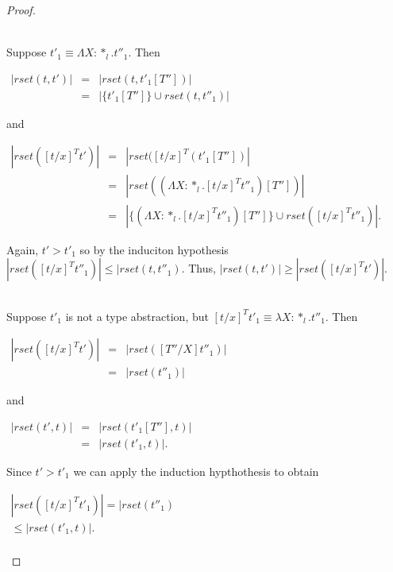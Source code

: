 \begin{proof}
\begin{itemize}
  \ \\
  Suppose $t'_1 \equiv \Lambda X:*_l.t''_1$.  Then 
  \begin{center}
    \begin{math}
      \begin{array}{lll}
        |rset(t,t')| & = & |rset(t, t'_1[T''])|\\
        & = & |\{t'_1[T'']\} \cup rset(t,t''_1)|
      \end{array}
    \end{math}
  \end{center}
  and
  \begin{center}
    \begin{math}
      \begin{array}{lll}
        |rset([t/x]^T t')| & = & |rset([t/x]^T(t'_1[T''])|\\
        & = & |rset((\Lambda X:*_l.[t/x]^T t''_1)[T''])|\\
        & = & |\{(\Lambda X:*_l.[t/x]^T t''_1)[T'']\} \cup rset([t/x]^T t''_1)|.
      \end{array}
    \end{math}
  \end{center}
  Again, $t' > t'_1$ so by the induciton hypothesis $|rset([t/x]^T t''_1)| \leq |rset(t,t''_1)$.  Thus,
  $|rset(t,t')| \geq |rset([t/x]^T t')|$.
  
  \ \\
  Suppose $t'_1$ is not a type abstraction, but $[t/x]^T t'_1 \equiv \lambda X:*_l.t''_1$.  Then
  \begin{center}
    \begin{math}
      \begin{array}{lll}
        |rset([t/x]^T t')| & = & |rset([T''/X]t''_1)|\\
        & = & |rset(t''_1)|
      \end{array}
    \end{math}
  \end{center}
  and
  \begin{center}
    \begin{math}
      \begin{array}{lll}
        |rset(t',t)| & = & |rset(t'_1[T''], t)|\\
        & = & |rset(t'_1,t)|.
      \end{array}
    \end{math}
  \end{center}
  Since $t' > t'_1$ we can apply the induction hypthothesis to obtain
  \begin{center}
    \begin{math}
      \begin{array}{lll}
        |rset([t/x]^T t'_1)| = |rset(t''_1)\\ 
        \leq |rset(t'_1,t)|.\\
        

\end{array}
\end{math}
\end{center}
\end{itemize}
\end{proof}
